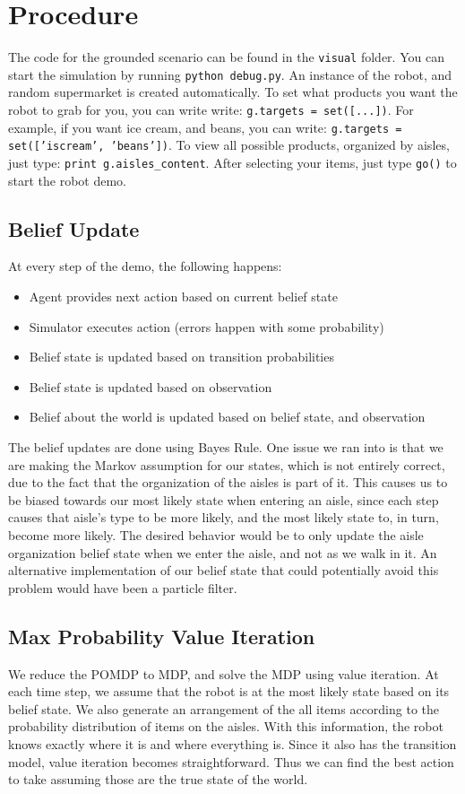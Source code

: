 \documentclass{pset}
\begin{document}
\section{Procedure}
\label{sec:procedure}
The code for the grounded scenario can be found in the \texttt{visual} folder.
You can start the simulation by running \texttt{python debug.py}.
An instance of the robot, and random supermarket is created automatically.
To set what products you want the robot to grab for you, you can write write:
\texttt{g.targets = set([...])}. For example, if you want ice cream, and beans,
you can write: \texttt{g.targets = set(['iscream', 'beans'])}. To view all possible
products, organized by aisles, just type: \texttt{print g.aisles\_content}.
After selecting your items, just type \texttt{go()} to start the robot demo.

\subsection{Belief Update}
At every step of the demo, the following happens:

\begin{itemize}
\item Agent provides next action based on current belief state
\item Simulator executes action (errors happen with some probability)
\item Belief state is updated based on transition probabilities
\item Belief state is updated based on observation
\item Belief about the world is updated based on belief state, and observation
\end{itemize}

The belief updates are done using Bayes Rule. One issue we ran into is that we are
making the Markov assumption for our states, which is not entirely correct, due to
the fact that the organization of the aisles is part of it. This causes us to be biased
towards our most likely state when entering an aisle, since each step causes
that aisle's type to be more likely, and the most likely state to, in turn, become
more likely. The desired behavior would be to only update the aisle organization
belief state when we enter the aisle, and not as we walk in it. An alternative
implementation of our belief state that could potentially avoid this problem would
have been a particle filter.

\subsection{Max Probability Value Iteration}
We reduce the POMDP to MDP, and solve the MDP using value iteration. At each time step, we assume
that the robot is at the most likely state based on its belief state. We also generate an
arrangement of the all items according to the probability distribution of items on the aisles. With
this information, the robot knows exactly where it is and where everything is. Since it also has the
transition model, value iteration becomes straightforward. Thus we can find the best action to take
assuming those are the true state of the world.
\end{document}
